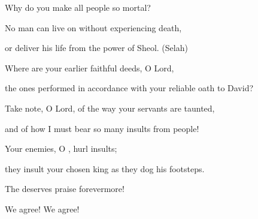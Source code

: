 {\par }{\Q Why
do you make
all
people
so mortal?
\par }{\Q {}No
man
can live
on without
experiencing
death,
\par }{\Q or deliver
his life
from the power
of Sheol.
(Selah)
\par }{\Q {}Where
are your earlier
faithful
deeds, O Lord,
\par }{\Q the ones performed in accordance with your reliable
oath
to David?
\par }{\Q {}Take note,
O Lord,
of the way your servants
are taunted,
\par }{\Q and of how I must bear
so
many
insults
from people!
\par }{\Q {}Your enemies,
O
{}, hurl insults;
\par }{\Q they insult
your chosen king as they dog his footsteps.
\par }{\Q The
{}
deserves
praise forevermore!
\par }{\Q We agree! We agree!


\par }
